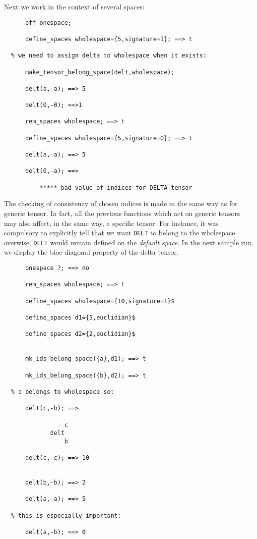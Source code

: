 Next we work in the context of several spaces:
\begin{verbatim}
      off onespace;

      define_spaces wholespace={5,signature=1}; ==> t

  % we need to assign delta to wholespace when it exists:

      make_tensor_belong_space(delt,wholespace);

      delt(a,-a); ==> 5

      delt(0,-0); ==>1

      rem_spaces wholespace; ==> t

      define_spaces wholespace={5,signature=0}; ==> t

      delt(a,-a); ==> 5

      delt(0,-a); ==>

          ***** bad value of indices for DELTA tensor
\end{verbatim}
The checking of consistency of chosen indices is made in the same way as for
generic tensor. In fact, all the previous functions which act on generic tensors
may also affect, in the same way, a specific tensor. For instance, it was
compulsory to explicitly tell that we want \texttt{DELT} to belong to the
wholespace   overwise,
\texttt{DELT} would remain defined on the \emph{default space}.
In the next sample run,  we display the bloc-diagonal property of
the  delta tensor.
\begin{verbatim}
      onespace ?; ==> no

      rem_spaces wholespace; ==> t

      define_spaces wholespace={10,signature=1}$

      define_spaces d1={5,euclidian}$

      define_spaces d2={2,euclidian}$


      mk_ids_belong_space({a},d1); ==> t

      mk_ids_belong_space({b},d2); ==> t

  % c belongs to wholespace so:

      delt(c,-b); ==>

                 c
             delt
                 b

      delt(c,-c); ==> 10


      delt(b,-b); ==> 2

      delt(a,-a); ==> 5

  % this is especially important:

      delt(a,-b); ==> 0
\end{verbatim}

